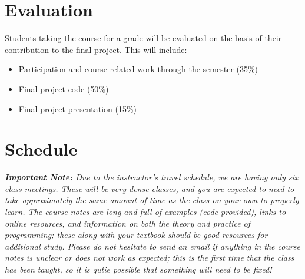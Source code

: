 \documentclass[10pt,a4paper]{amsart}
\begin{document}
\section{Evaluation}

Students taking the course for a grade will be evaluated on the basis of their contribution to the final project. This will include:

\begin{itemize}
 \item Participation and course-related work through the semester (35\%)
 \item Final project code (50\%)
 \item Final project presentation (15\%)
\end{itemize}

\section{Schedule}

\noindent\emph{\textbf{Important Note:} Due to the instructor's travel schedule, we are having only six class meetings. These will be very dense classes, and you are expected to need to take approximately the same amount of time as the class on your own to properly learn. The course notes are long and full of examples (code provided), links to online resources, and information on both the theory and practice of programming; these along with your textbook should be good resources for additional study. Please do not hesitate to send an email if anything in the course notes is unclear or does not work as expected; this is the first time that the class has been taught, so it is qutie possible that something will need to be fixed!}\\
\end{document}
